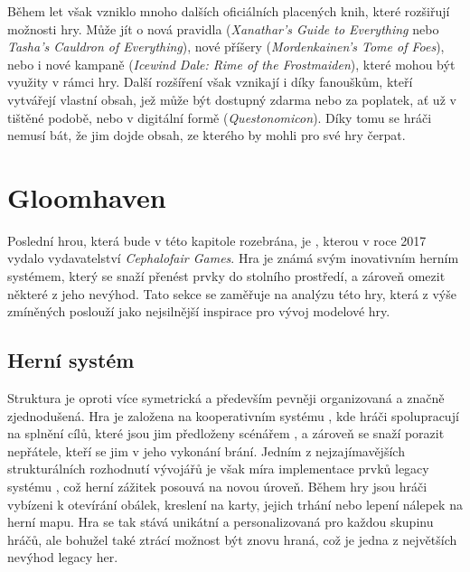 Během let však vzniklo mnoho dalších oficiálních placených knih, které rozšiřují možnosti hry. Může jít o nová pravidla (\textit{Xanathar's Guide to Everything} nebo \textit{Tasha's Cauldron of Everything}), nové příšery (\textit{Mordenkainen's Tome of Foes}), nebo i nové kampaně (\textit{Icewind Dale: Rime of the Frostmaiden}), které mohou být využity v rámci hry. Další rozšíření však vznikají i díky fanouškům, kteří vytvářejí vlastní obsah, jež může být dostupný zdarma nebo za poplatek, ať už v tištěné podobě, nebo v digitální formě (\textit{Questonomicon}). Díky tomu se hráči nemusí bát, že jim dojde obsah, ze kterého by mohli pro své hry čerpat.



\section{Gloomhaven}
\label{sec:gloomhaven}

Poslední hrou, která bude v této kapitole rozebrána, je , kterou v roce 2017 vydalo vydavatelství \textit{Cephalofair Games}. Hra je známá svým inovativním herním systémem, který se snaží přenést prvky \dnd{} do stolního prostředí, a zároveň omezit některé z jeho nevýhod. Tato sekce se zaměřuje na analýzu této hry, která z výše zmíněných poslouží jako nejsilnější inspirace pro vývoj modelové hry. \cite{gloomhaven}

\subsection{Herní systém}
\label{subsec:gh_gameplay}

Struktura  je oproti \dnd{} více symetrická a především pevněji organizovaná a značně zjednodušená. Hra je založena na kooperativním systému , kde hráči spolupracují na splnění cílů, které jsou jim předloženy scénářem , a zároveň se snaží porazit nepřátele, kteří se jim v jeho vykonání brání. Jedním z nejzajímavějších strukturálních rozhodnutí vývojářů je však míra implementace prvků legacy systému , což herní zážitek posouvá na novou úroveň. Během hry jsou hráči vybízeni k otevírání obálek, kreslení na karty, jejich trhání nebo lepení nálepek na herní mapu. Hra se tak stává unikátní a personalizovaná pro každou skupinu hráčů, ale bohužel také ztrácí možnost být znovu hraná, což je jedna z největších nevýhod legacy her.

